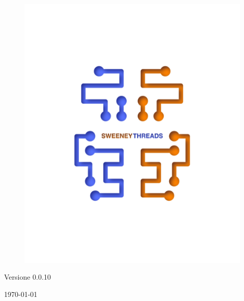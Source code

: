 \documentclass[a4paper]{article}
\begin{document}
\begin{titlepage}
		\begin{figure}[H]
			\centering
			\includegraphics[scale=0.8]{sweeney.png}
		\end{figure}
		\begin{center}
			Versione 0.0.10
		\end{center}
		{\large \today}\\[3cm] 
		\vfill  
	\end{titlepage}
	
	
	\tableofcontents
	
	\newpage 
\end{document}
